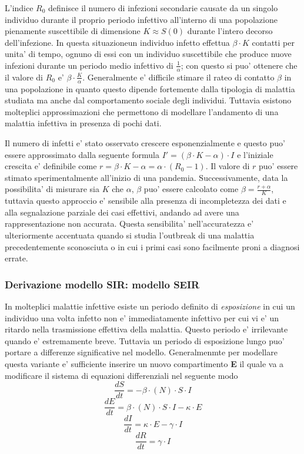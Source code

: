 L'indice $R_0$ definisce il numero di infezioni secondarie causate da un singolo individuo durante il proprio periodo infettivo 
all'interno di una popolazione pienamente suscettibile di dimensione $K \approx S(0)$ durante l'intero decorso dell'infezione. In 
questa situazioneun individuo infetto effettua $\beta \cdot K$ contatti per unita' di tempo, ognuno di essi con un individuo suscettibile 
che produce nuove infezioni durante un periodo medio infettivo di $\frac{1}{\alpha}$; con questo si puo' ottenere che il valore di $R_0$ e' 
$\beta \cdot \frac{K}{\alpha}$. Generalmente e' difficile stimare il rateo di contatto $\beta$ in una popolazione in quanto questo dipende fortemente 
dalla tipologia di malattia studiata ma anche dal comportamento sociale degli individui. Tuttavia esistono molteplici approssimazioni 
che permettono di modellare l'andamento di una malattia infettiva in presenza di pochi dati. 

Il numero di infetti e' stato osservato crescere esponenzialmente e questo puo' essere approssimato dalla seguente formula $I' = (\beta \cdot K - \alpha) \cdot I$
e l'iniziale crescita e' definibile come $r = \beta \cdot K - \alpha = \alpha \cdot (R_0 - 1)$. Il valore di $r$ puo' essere stimato sperimentalmente 
all'inizio di una pandemia. Successivamente, data la possibilita' di misurare sia $K$ che $\alpha$, $\beta$ puo' essere calcolato come 
$\beta = \frac{r + \alpha}{K}$, tuttavia questo approccio e' sensibile alla presenza di incompletezza dei dati e alla segnalazione parziale dei casi effettivi, andando 
ad avere una rappresentazione non accurata. Questa sensibilita' nell'accuratezza e' ulteriormente accentuata quando si studia l'outbreak di una malattia 
precedentemente sconosciuta o in cui i primi casi sono facilmente proni a diagnosi errate.   

\subsubsection{Derivazione modello SIR: modello SEIR}
In molteplici malattie infettive esiste un periodo definito di \emph{esposizione} \cite{wiki:Incubation_period} in cui un individuo una volta infetto non 
e' immediatamente infettivo per cui vi e' un ritardo nella trasmissione effettiva della malattia. Questo periodo e' irrilevante quando e' estremamente breve. 
Tuttavia un periodo di esposizione lungo puo' portare a differenze significative nel modello. Generalmenmte per modellare questa variante e' sufficiente 
inserire un nuovo compartimento \textbf{E} il quale va a modificare il sistema di equazioni differenziali nel seguente modo
$$\frac{dS}{dt} = - \beta \cdot (N) \cdot S \cdot I$$
$$\frac{dE}{dt} = \beta \cdot (N) \cdot S \cdot I - \kappa \cdot E$$
$$\frac{dI}{dt} = \kappa \cdot E - \gamma \cdot I$$
$$\frac{dR}{dt} = \gamma \cdot I$$

